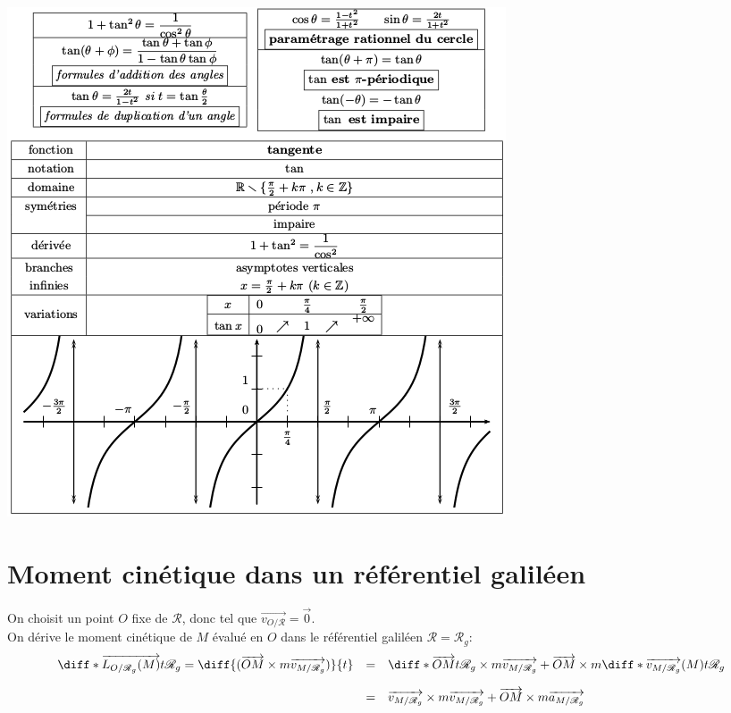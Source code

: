 \documentclass[a4paper,10pt]{book} %
\begin{document}
\newpage

\begin{center}\includegraphics[scale=0.6]{images/009.png}\end{center}

\section{Moment cinétique dans un référentiel galiléen}
On choisit un point $O$ fixe de $\mathcal{R}$, donc tel que $\overrightarrow{v_{O/\mathcal{R}}}=\overrightarrow{0}$.\\
On dérive le moment cinétique de $M$ évalué en $O$ dans le référentiel galiléen $\mathcal{R}=\mathcal{R}_g$:
$$\begin{array}{rcl}
\diff*{\overrightarrow{L_{O/\mathcal{R}_g}(M)}}{t}{\mathcal{R}_g}= \diff{(\overrightarrow{OM}\times m\overrightarrow{v_{M/\mathcal{R}_g}})}{t} &=& \diff*{\overrightarrow{OM}}{t}{\mathcal{R}_g}\times m\overrightarrow{v_{M/\mathcal{R}_g}}+\overrightarrow{OM}\times m\diff*{\overrightarrow{v_{M/\mathcal{R}_g}}(M)}{t}{\mathcal{R}_g}\\\\
&=&\overrightarrow{v_{M/\mathcal{R}_g}}\times m\overrightarrow{v_{M/\mathcal{R}_g}}+\overrightarrow{OM}\times m\overrightarrow{a_{M/\mathcal{R}_g}}
\end{array}$$
\end{document}

